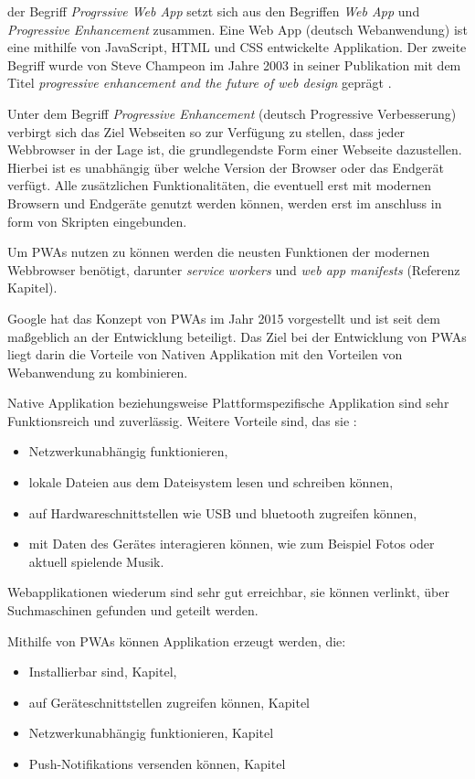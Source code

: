 der Begriff \textit{Progrssive Web App} setzt sich aus den Begriffen \textit{Web App} und \textit{Progressive Enhancement} zusammen. Eine Web App (deutsch Webanwendung) ist eine mithilfe von JavaScript, HTML und CSS entwickelte Applikation. Der zweite Begriff wurde von Steve Champeon im Jahre 2003 in seiner Publikation mit dem Titel \textit{progressive enhancement and the future of web design} geprägt \cite{Champeon}.

Unter dem Begriff \textit{Progressive Enhancement} (deutsch Progressive Verbesserung) verbirgt sich das Ziel Webseiten so zur Verfügung zu stellen, dass jeder Webbrowser in der Lage ist, die grundlegendste Form einer Webseite dazustellen. Hierbei ist es unabhängig über welche Version der Browser oder das Endgerät verfügt. 
Alle zusätzlichen Funktionalitäten, die eventuell erst mit modernen Browsern und Endgeräte genutzt werden können, werden erst im anschluss in form von Skripten eingebunden. 

Um PWAs nutzen zu können werden die neusten Funktionen der modernen Webbrowser benötigt, darunter \textit{service workers} und \textit{web app manifests} (Referenz Kapitel). 

Google hat das Konzept von PWAs im Jahr 2015 vorgestellt und ist seit dem maßgeblich an der Entwicklung beteiligt. 
Das Ziel bei der Entwicklung von PWAs liegt darin die Vorteile von Nativen Applikation mit den Vorteilen von Webanwendung zu kombinieren. 


Native Applikation beziehungsweise Plattformspezifische Applikation sind sehr Funktionsreich und zuverlässig. Weitere Vorteile sind, das sie : 
\begin{itemize}
    \item  Netzwerkunabhängig funktionieren,
    \item  lokale Dateien aus dem Dateisystem lesen und schreiben können, 
    \item  auf Hardwareschnittstellen wie USB und bluetooth zugreifen können, 
    \item  mit Daten des Gerätes interagieren können, wie zum Beispiel Fotos oder aktuell spielende Musik. 
\end{itemize}

Webapplikationen wiederum sind sehr gut erreichbar, sie können verlinkt, über Suchmaschinen gefunden und geteilt werden. 

Mithilfe von PWAs können Applikation erzeugt werden, die: 
\begin{itemize}
    \item Installierbar sind, Kapitel, 
    \item auf Geräteschnittstellen zugreifen können, Kapitel 
    \item Netzwerkunabhängig funktionieren, Kapitel
    \item Push-Notifikations versenden können, Kapitel
\end{itemize}

